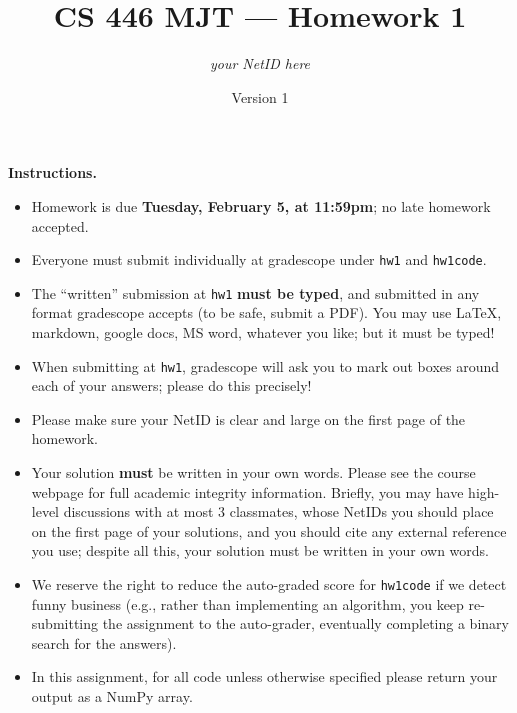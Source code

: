 \documentclass{article}
\title{CS 446 MJT --- Homework 1}
\author{\emph{your NetID here}}
\date{Version 1}
\theoremstyle{definition}
\theoremstyle{remark}
\begin{document}
        \maketitle

        \textbf{Instructions.}
        \begin{itemize}
          \item
            Homework is due \textbf{Tuesday, February 5, at 11:59pm}; no late homework accepted.

          \item
            Everyone must submit individually at gradescope under \texttt{hw1} and \texttt{hw1code}.

          \item
            The ``written'' submission at \texttt{hw1} \textbf{must be typed}, and submitted in
            any format gradescope accepts (to be safe, submit a PDF).  You may use \LaTeX, markdown,
            google docs, MS word, whatever you like; but it must be typed!

          \item
            When submitting at \texttt{hw1}, gradescope will ask you to mark out boxes
            around each of your answers; please do this precisely!

          \item
            Please make sure your NetID is clear and large on the first page of the homework.

          \item
            Your solution \textbf{must} be written in your own words.
            Please see the course webpage for full academic integrity information.
            Briefly, you may have high-level discussions with at most 3 classmates,
            whose NetIDs you should place on the first page of your solutions,
            and you should cite any external reference you use; despite all this,
            your solution must be written in your own words.

          \item
            We reserve the right to reduce the auto-graded score for \texttt{hw1code}
            if we detect funny business (e.g., rather than implementing an algorithm,
            you keep re-submitting the assignment to the auto-grader, eventually completing
            a binary search for the answers).
            \item In this assignment, for all code unless otherwise specified please return your output as a NumPy array.

        \end{itemize}
\end{document}
